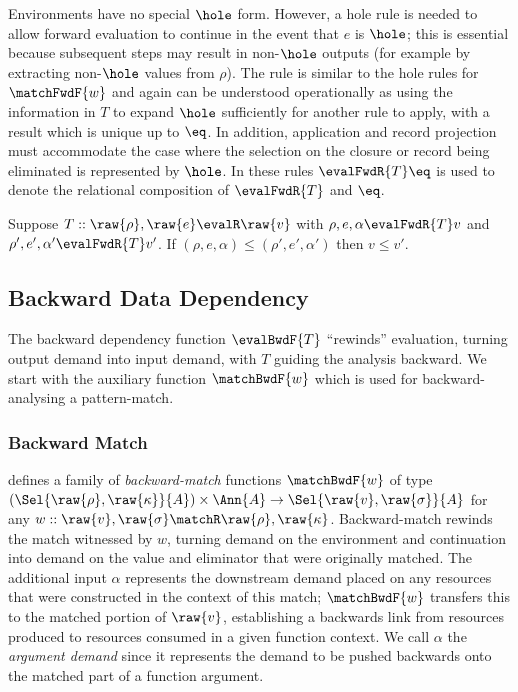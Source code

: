  Environments have no special $\hole$ form. However, a hole rule is needed to allow forward evaluation to continue in the event that $e$ is $\hole$; this is essential because subsequent steps may result in non-$\hole$ outputs (for example by extracting non-$\hole$ values from $\rho$). The rule is similar to the hole rules for $\matchFwdF{w}$ and again can be understood operationally as using the information in $T$ to expand $\hole$ sufficiently for another rule to apply, with a result which is unique up to $\eq$. In addition, application and record projection must accommodate the case where the selection on the closure or record being eliminated is represented by $\hole$. In these rules $\evalFwdR{T}\eq$ is used to denote the relational composition of $\evalFwdR{T}$ and $\eq$.

\begin{lemma}
   Suppose $T :: \raw{\rho}, \raw{e} \evalR \raw{v}$ with $\rho, e, \alpha \evalFwdR{T} v$ and $\rho', e', \alpha' \evalFwdR{T} v'$. If $(\rho, e, \alpha) \leq (\rho', e', \alpha')$ then $v \leq v'$.
\end{lemma}

\subsection{Backward Data Dependency}
\label{sec:data-dependencies:analyses:bwd}

The backward dependency function $\evalBwdF{T}$ ``rewinds'' evaluation, turning output demand into input demand, with $T$ guiding the analysis backward. We start with the auxiliary function $\matchBwdF{w}$ which is used for backward-analysing a pattern-match.

\subsubsection{Backward Match}
\label{sec:data-dependencies:analyses:bwd:pattern-match}

 defines a family of \emph{backward-match} functions $\matchBwdF{w}$ of type $(\Sel{\raw{\rho}, \raw{\kappa}}{A}) \times \Ann{A} \to \Sel{\raw{v}, \raw{\sigma}}{A}$ for any $w :: \raw{v}, \raw{\sigma} \matchR \raw{\rho}, \raw{\kappa}$. Backward-match rewinds the match witnessed by $w$, turning demand on the environment and continuation into demand on the value and eliminator that were originally matched. The additional input $\alpha$ represents the downstream demand placed on any resources that were constructed in the context of this match; $\matchBwdF{w}$ transfers this to the matched portion of $\raw{v}$, establishing a backwards link from resources produced to resources consumed in a given function context. We call $\alpha$ the \emph{argument demand} since it represents the demand to be pushed backwards onto the matched part of a function argument.

